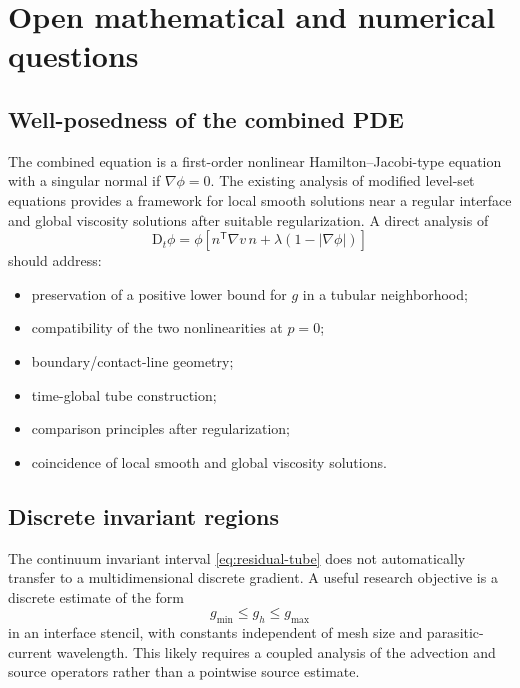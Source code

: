 \documentclass[11pt,a4paper]{article}
\theoremstyle{definition}
\theoremstyle{remark}
\newcommand{\abs}[1]{\left\lvert #1\right\rvert}
\newcommand{\material}{\mathrm{D}_t}
\begin{document}
\section{Open mathematical and numerical questions}

\subsection{Well-posedness of the combined PDE}

The combined equation is a first-order nonlinear Hamilton--Jacobi-type equation with a singular normal if $\nabla\phi=0$. The existing analysis of modified level-set equations \cite{BotheFrickeSoga2024} provides a framework for local smooth solutions near a regular interface and global viscosity solutions after suitable regularization. A direct analysis of
\begin{equation}
  \material\phi=\phi\left[n^{\mathsf T}\nabla v\,n+\lambda(1-\abs{\nabla\phi})\right]
\end{equation}
should address:
\begin{itemize}
  \item preservation of a positive lower bound for $g$ in a tubular neighborhood;
  \item compatibility of the two nonlinearities at $p=0$;
  \item boundary/contact-line geometry;
  \item time-global tube construction;
  \item comparison principles after regularization;
  \item coincidence of local smooth and global viscosity solutions.
\end{itemize}

\subsection{Discrete invariant regions}

The continuum invariant interval \eqref{eq:residual-tube} does not automatically transfer to a multidimensional discrete gradient. A useful research objective is a discrete estimate of the form
\begin{equation}
  g_{\min}\le g_h\le g_{\max}
\end{equation}
in an interface stencil, with constants independent of mesh size and parasitic-current wavelength. This likely requires a coupled analysis of the advection and source operators rather than a pointwise source estimate.
\end{document}
